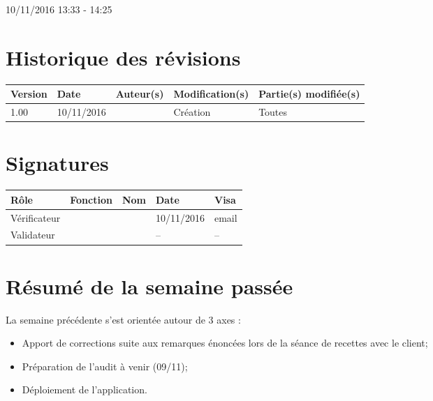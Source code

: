 \documentclass [a4paper] {article}
\begin{document}
10/11/2016			 				%
\hfill   
\hfill 	 13:33 - 14:25				%


\section*{Historique des révisions}
\begin{center}
			\begin{tabular}{| p{2.5cm} | p{3cm} | p{3cm} | p{3cm} | p{3.5cm} |}
				\hline
				\rowcolor{Gray}
				Version & Date & Auteur(s) & Modification(s) & Partie(s) modifiée(s)		 \\
				\hline
				1.00 & 10/11/2016 & \Kafui & Création & Toutes \\
				\hline			
			\end{tabular}
		\end{center}

\section*{Signatures}

		\begin{center}
			\begin{tabular}{| p{2.5cm} | p{4cm} | p{3cm} | p{3cm} | p{2.5cm} |}
				\hline
				\rowcolor{Gray}
				Rôle & Fonction & Nom & Date & Visa		 \\
				\hline
				Vérificateur & \RGC & \Melissa & 10/11/2016 & email \\[30pt]
				\hline
				Validateur & \CP & \Pierre &  -- & -- \\[30pt]	
				\hline
			\end{tabular}
		\end{center}

\section{Résumé de la semaine passée}
La semaine précédente s'est orientée autour de 3 axes :  
\begin{itemize}
	\item Apport de corrections suite aux remarques énoncées lors de la séance de recettes avec le client;
	\item Préparation de l'audit à venir (09/11);
	\item Déploiement de l'application.
\end{itemize} 
\end{document}
